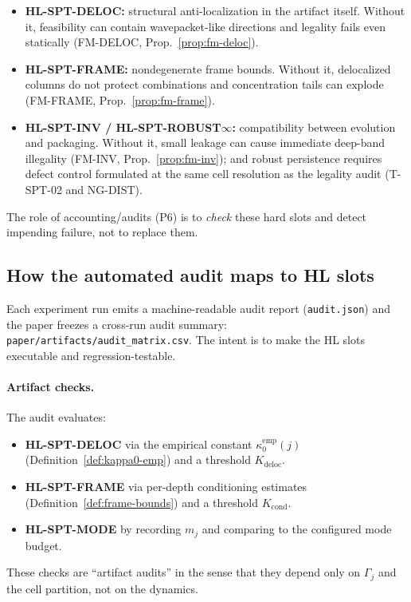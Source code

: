 \documentclass[11pt]{article}
\begin{document}
\begin{itemize}
\item \textbf{HL-SPT-DELOC:} structural anti-localization in the artifact itself. Without it, feasibility can contain wavepacket-like directions and legality fails even statically (FM-DELOC, Prop.~\ref{prop:fm-deloc}).
\item \textbf{HL-SPT-FRAME:} nondegenerate frame bounds. Without it, delocalized columns do not protect combinations and concentration tails can explode (FM-FRAME, Prop.~\ref{prop:fm-frame}).
\item \textbf{HL-SPT-INV / HL-SPT-ROBUST$\infty$:} compatibility between evolution and packaging. Without it, small leakage can cause immediate deep-band illegality (FM-INV, Prop.~\ref{prop:fm-inv}); and robust persistence requires defect control formulated at the same cell resolution as the legality audit (T-SPT-02 and NG-DIST).
\end{itemize}

The role of accounting/audits (P6) is to \emph{check} these hard slots and detect impending failure, not to replace them.

\subsection{How the automated audit maps to HL slots}

Each experiment run emits a machine-readable audit report (\texttt{audit.json}) and the paper freezes a cross-run audit summary:
\texttt{paper/artifacts/audit\_matrix.csv}.
The intent is to make the HL slots executable and regression-testable.

\paragraph{Artifact checks.}
The audit evaluates:
\begin{itemize}
\item \textbf{HL-SPT-DELOC} via the empirical constant $\kappa^{\mathrm{emp}}_0(j)$ (Definition~\ref{def:kappa0-emp}) and a threshold $K_{\mathrm{deloc}}$.
\item \textbf{HL-SPT-FRAME} via per-depth conditioning estimates (Definition~\ref{def:frame-bounds}) and a threshold $K_{\mathrm{cond}}$.
\item \textbf{HL-SPT-MODE} by recording $m_j$ and comparing to the configured mode budget.
\end{itemize}
These checks are ``artifact audits'' in the sense that they depend only on $\Gamma_j$ and the cell partition, not on the dynamics.
\end{document}
